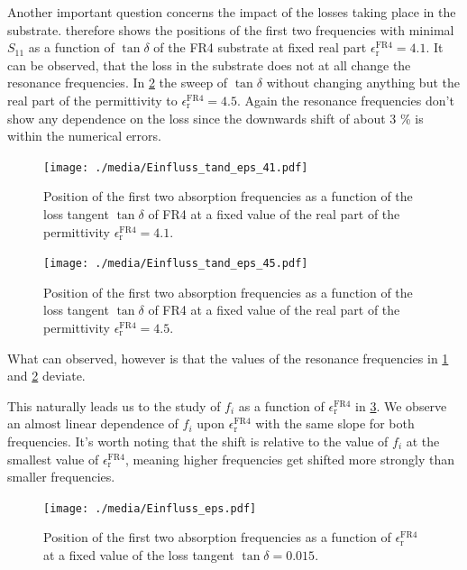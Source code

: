 Another important question concerns the impact of the losses taking place in the substrate.  therefore shows the positions of the first two frequencies with minimal $S_{11}$ as a function of $\tan\delta$ of the FR4 substrate at fixed real part $\epsilon_\mathrm{r}^\text{FR4}=4.1$.
It can be observed, that the loss in the substrate does not at all change the resonance frequencies.
In \cref{fig:tand_fi_45} the sweep of $\tan\delta$ without changing anything but the real part of the permittivity to $\epsilon_\mathrm{r}^\text{FR4}=4.5$. Again the resonance frequencies don't show any dependence on the loss since the downwards shift of about 3 \% is within the numerical errors.

\begin{figure}
\centering
\texttt{[image: ./media/Einfluss\_tand\_eps\_41.pdf]}
\caption{Position of the first two absorption frequencies as a function of the loss tangent $\tan\delta$ of FR4 at a fixed value of the real part of the permittivity $\epsilon_\mathrm{r}^\text{FR4}=4.1$.}
\label{fig:tand_fi_41}
\end{figure}
\begin{figure}
\centering
\texttt{[image: ./media/Einfluss\_tand\_eps\_45.pdf]}
\caption{Position of the first two absorption frequencies as a function of the loss tangent $\tan\delta$ of FR4 at a fixed value of the real part of the permittivity $\epsilon_\mathrm{r}^\text{FR4}=4.5$.}
\label{fig:tand_fi_45}
\end{figure}

What can observed, however is that the values of the resonance frequencies in \cref{fig:tand_fi_41} and \cref{fig:tand_fi_45} deviate. 

This naturally leads us to the study of $f_i$ as a function of $\epsilon_\mathrm{r}^\text{FR4}$ in \cref{fig:fi_epsr}. We observe an almost linear dependence of $f_i$ upon $\epsilon_\mathrm{r}^\text{FR4}$ with the same slope for both frequencies. It's worth noting that the shift is relative to the value of $f_i$ at the smallest value of $\epsilon_\mathrm{r}^\text{FR4}$, meaning higher frequencies get shifted more strongly than smaller frequencies. 

\begin{figure}
\centering
\texttt{[image: ./media/Einfluss\_eps.pdf]}
\caption{Position of the first two absorption frequencies as a function of $\epsilon_\mathrm{r}^\text{FR4}$ at a fixed value of the loss tangent $\tan\delta=0.015$.}
\label{fig:fi_epsr}
\end{figure}

